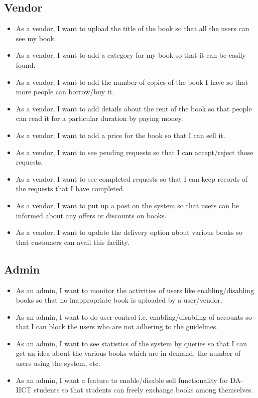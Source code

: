 \documentclass[conference]{IEEEtran}
\begin{document}
\subsection{Vendor}
\begin{itemize}
    \item As a vendor, I want to upload the title of the book so that all the users can see my book.
\item As a vendor, I want to add a category for my book so that it can be easily found.
\item As a vendor, I want to add the number of copies of the book I have so that more people can borrow/buy it.
\item As a vendor, I want to add details about the rent of the book so that people can read it for a particular duration by paying money.
\item As a vendor, I want to add a price for the book so that I can sell it.
\item As a vendor, I want to see pending requests so that I can accept/reject those requests.
\item As a vendor, I want to see completed requests so that I can keep records of the requests that I have completed.
\item As a vendor, I want to put up a post on the system so that users can be informed about any offers or discounts on books.
\item As a vendor, I want to update the delivery option about various books so that customers can avail this facility.
\end{itemize}
\subsection{Admin}
\begin{itemize}
    \item As an admin, I want to monitor the activities of users like enabling/disabling books so that no inappropriate book is uploaded by a user/vendor.
\item As an admin, I want to do user control i.e. enabling/disabling of accounts so that I can block the users who are not adhering to the guidelines.
\item As an admin, I want to see statistics of the system by queries so that I can get an idea about the various books which are in demand, the number of users using the system, etc.
\item As an admin, I want a feature to enable/disable sell functionality for DA-IICT students so that students can freely exchange books among themselves.

\end{itemize}
\end{document}
